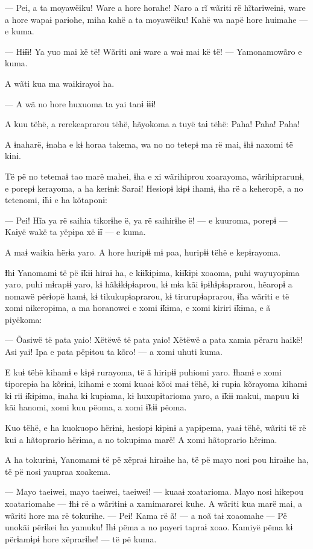 --- Pei, a ta moyawëiku! Ware a hore horahe! Naro a rĩ wãriti rë
hĩtariweinɨ, ware a hore wapaɨ parɨohe, miha kahë a ta moyawëiku! Kahë
wa napë hore huimahe --- e kuma. 

--- Hɨ̃ɨɨ! Ya yuo mai kë të! Wãriti anɨ ware a waɨ mai kë të! ---
Yamonamowãro e kuma. 

A wãti kua ma waikirayoi ha. 

--- A wã no hore huxuoma ta yai tanɨ ɨɨɨ!

A kuu tëhë, a rerekeaprarou tëhë, hãyokoma a tuyë taɨ tëhë: Paha! Paha!
Paha! 

A ɨnaharë, ɨnaha e kɨ horaa takema, wa no no tetepɨ ma rë mai, ɨhɨ
naxomi të kɨnɨ. 

Të pë no tetemaɨ tao marë mahei, ɨha e xi wãrihiprou xoarayoma,
wãrihiprarunɨ, e porepɨ kerayoma, a ha kerɨnɨ: Sarai! Hesiopɨ kɨpɨ
ihamɨ, ɨha rë a keheropë, a no tetenomi, ɨ̃hɨ e ha kõtaponɨ:

--- Pei! Hĩa ya rë saihia tikorɨhe ë, ya rë saihirɨhe ë! --- e kuuroma,
porepɨ --- Kaɨyë wakë ta yëpɨpa xë ɨ̃ɨ --- e kuma. 

A maɨ waikia hërɨa yaro. A hore huripɨɨ mɨ paa, huripɨɨ tëhë e
kepɨrayoma. 

Ɨhɨ Yanomamɨ të pë ɨ̃kɨɨ hiraɨ ha, e kɨɨ̃kɨpɨma, kɨɨ̃kɨpɨ xoaoma, puhi
wayuyopɨma yaro, puhi mɨrapɨɨ yaro, kɨ hãkɨkɨpɨaprou, kɨ mɨa kãi
ɨpɨhɨpɨaprarou, hẽaropɨ a nomawë përɨopë hamɨ, kɨ tikukupɨaprarou, kɨ
tirurupɨaprarou, ɨ̃ha wãriti e të xomi nikeropɨma, a ma horanowei e xomi
ɨ̃kɨma, e xomi kiriri ɨ̃kɨma, e ã piyëkoma:

--- Õasiwë të pata yaio! Xëtëwë të pata yaio! Xëtëwë a pata xamia përaru
haikë! Asi yai! Ipa e pata pëpɨtou ta kõro! --- a xomi uhuti kuma. 

E kuɨ tëhë kihamɨ e kɨpɨ rurayoma, të ã hiripɨɨ puhiomi yaro. Ɨhamɨ e
xomi tiporepɨa ha kõrɨnɨ, kihamɨ e xomi kuaaɨ kõoi maɨ tëhë, kɨ rupɨa
kõrayoma kihamɨ kɨ rii ɨ̃kɨpɨma, ɨnaha kɨ kupɨama, kɨ huxupɨtarioma yaro,
a ɨ̃kɨɨ makui, mapuu kɨ kãi hanomi, xomi kuu pëoma, a xomi ɨ̃kɨɨ pëoma. 

Kuo tëhë, e ha kuokuopo hërɨnɨ, hesiopɨ kɨpɨnɨ a yapɨpema, yaaɨ tëhë,
wãriti të rë kui a hãtoprario hërɨma, a no tokupɨma marë! A xomi
hãtoprario hërɨma. 

A ha tokurɨnɨ, Yanomamɨ të pë xëpraɨ hiraɨhe ha, të pë mayo nosi pou
hiraɨhe ha, të pë nosi yaupraa xoakema. 

--- Mayo taeiwei, mayo taeiwei, taeiwei! --- kuaaɨ xoatarioma. Mayo nosi
hikepou xoatariomahe --- Ɨhɨ rë a wãritinɨ a xamimararei kuhe. A wãriti
kua marë mai, a wãriti hore ma rë tokurɨhe. --- Pei! Kama rë ã! --- a
noã taɨ xoaomahe --- Pë unokãi përɨkei ha yamuku! Ɨhɨ pëma a no payeri
tapraɨ xoao. Kamiyë pëma kɨ përɨamɨpɨ hore xëprarɨhe! --- të pë kuma. 

